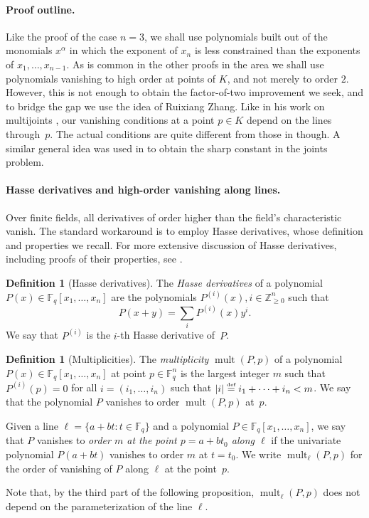 \documentclass{daj}
\theoremstyle{definition}
\newtheorem{definition}[theorem]{Definition}
\newcommand*{\eqdef}{\stackrel{\mbox{\normalfont\tiny def}}{=}}   %
\newcommand*{\Znneg}{\mathbb{Z}_{\geq 0}}                          %
\newcommand*{\Fq}{\mathbb{F}_q}                                  %
\DeclarePairedDelimiter\abs{\lvert}{\rvert}                     %
\DeclareMathOperator{\mult}{mult}                              %
\begin{document}
\paragraph{Proof outline.} Like the proof of the case $n=3$, we shall use
polynomials built out of the monomials $x^{\alpha}$ in which the exponent of $x_n$
is less constrained than the exponents of $x_1,\dotsc,x_{n-1}$. As is common
in the other proofs in the area we shall use polynomials vanishing to
high order at points of $K$, and not merely to order $2$.
However, this is not enough to obtain the factor-of-two improvement we seek,
and to bridge the gap we use the idea of Ruixiang Zhang.
Like in his work on multijoints \cite{zhang}, our vanishing
conditions at a point $p\in K$ depend on the lines through~$p$.
The actual conditions are quite different from those in \cite{zhang} though. A similar general idea was used in \cite{yu_zhao} to obtain the sharp constant in the joints problem.

\paragraph{Hasse derivatives and high-order vanishing along lines.}
Over finite fields, all derivatives of order higher than the field's characteristic vanish.
The standard workaround is to employ Hasse derivatives, whose definition and properties we recall.
For more extensive discussion of Hasse derivatives, including proofs of their properties, see \cite[Section 2]{dkss}.

\begin{definition}[Hasse derivatives]
The \emph{Hasse derivatives} of a polynomial $P(x)\in\Fq [x_1,\dotsc,x_n]$ are the polynomials $P^{(i)}(x),i\in \Znneg^{n}$ such that
\[P(x+y)=\sum_{i}P^{(i)}(x)y^i.\]
We say that $P^{(i)}$ is the $i$-th Hasse derivative of~$P$.
\end{definition}
\begin{definition}[Multiplicities]
The \emph{multiplicity} $\mult (P,p)$ of a polynomial $P(x)\in\Fq [x_1,\dotsc,x_n]$ at point $p\in\Fq^n$ is the largest integer $m$ such that $P^{(i)}(p)=0$ for all $i=(i_1,\ldots,i_n)$ such that $\abs{i}\eqdef i_1+\dotsb+i_n<m$. We say that the polynomial $P$ vanishes to order $\mult (P,p)$ at~$p$.

Given a line $\ell=\{a+bt:t\in\Fq\}$ and a polynomial $P\in \Fq[x_1,\dotsc,x_n]$, we say
that $P$ vanishes to \emph{order $m$ at the point $p=a+bt_0$ along $\ell$}
if the univariate polynomial $P(a+bt)$ vanishes to order $m$ at $t=t_0$.
We write $\mult_{\ell}(P,p)$ for the order of vanishing
of $P$ along $\ell$ at the point~$p$.
\end{definition}
Note that, by the third part of the following proposition, $\mult_{\ell}(P,p)$ does not depend on the parameterization of the line $\ell$.
\end{document}
